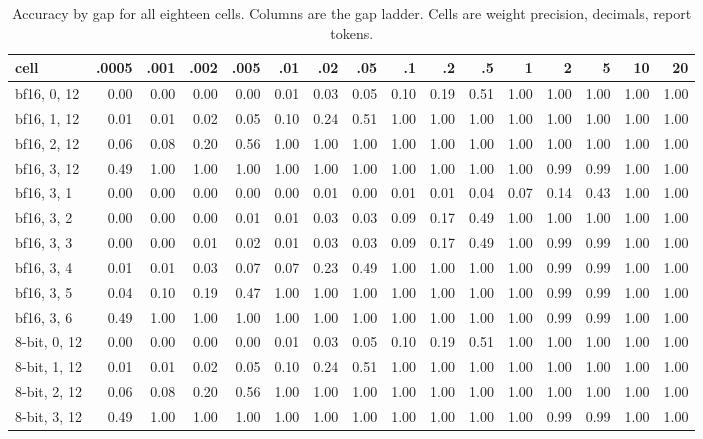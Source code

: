 \documentclass{article}
\theoremstyle{definition}
\theoremstyle{remark}
\begin{document}
\begin{table}[h]
\centering
\scriptsize
\caption{Accuracy by gap for all eighteen cells. Columns are the gap ladder. Cells are weight precision, decimals, report tokens.}
\label{tab:cells}
\setlength{\tabcolsep}{3pt}
\begin{tabular}{lrrrrrrrrrrrrrrr}
\toprule
cell & .0005 & .001 & .002 & .005 & .01 & .02 & .05 & .1 & .2 & .5 & 1 & 2 & 5 & 10 & 20 \\
\midrule
bf16, 0, 12 & 0.00 & 0.00 & 0.00 & 0.00 & 0.01 & 0.03 & 0.05 & 0.10 & 0.19 & 0.51 & 1.00 & 1.00 & 1.00 & 1.00 & 1.00 \\
bf16, 1, 12 & 0.01 & 0.01 & 0.02 & 0.05 & 0.10 & 0.24 & 0.51 & 1.00 & 1.00 & 1.00 & 1.00 & 1.00 & 1.00 & 1.00 & 1.00 \\
bf16, 2, 12 & 0.06 & 0.08 & 0.20 & 0.56 & 1.00 & 1.00 & 1.00 & 1.00 & 1.00 & 1.00 & 1.00 & 1.00 & 1.00 & 1.00 & 1.00 \\
bf16, 3, 12 & 0.49 & 1.00 & 1.00 & 1.00 & 1.00 & 1.00 & 1.00 & 1.00 & 1.00 & 1.00 & 1.00 & 0.99 & 0.99 & 1.00 & 1.00 \\
bf16, 3, 1 & 0.00 & 0.00 & 0.00 & 0.00 & 0.00 & 0.01 & 0.00 & 0.01 & 0.01 & 0.04 & 0.07 & 0.14 & 0.43 & 1.00 & 1.00 \\
bf16, 3, 2 & 0.00 & 0.00 & 0.00 & 0.01 & 0.01 & 0.03 & 0.03 & 0.09 & 0.17 & 0.49 & 1.00 & 1.00 & 1.00 & 1.00 & 1.00 \\
bf16, 3, 3 & 0.00 & 0.00 & 0.01 & 0.02 & 0.01 & 0.03 & 0.03 & 0.09 & 0.17 & 0.49 & 1.00 & 0.99 & 0.99 & 1.00 & 1.00 \\
bf16, 3, 4 & 0.01 & 0.01 & 0.03 & 0.07 & 0.07 & 0.23 & 0.49 & 1.00 & 1.00 & 1.00 & 1.00 & 0.99 & 0.99 & 1.00 & 1.00 \\
bf16, 3, 5 & 0.04 & 0.10 & 0.19 & 0.47 & 1.00 & 1.00 & 1.00 & 1.00 & 1.00 & 1.00 & 1.00 & 0.99 & 0.99 & 1.00 & 1.00 \\
bf16, 3, 6 & 0.49 & 1.00 & 1.00 & 1.00 & 1.00 & 1.00 & 1.00 & 1.00 & 1.00 & 1.00 & 1.00 & 0.99 & 0.99 & 1.00 & 1.00 \\
8-bit, 0, 12 & 0.00 & 0.00 & 0.00 & 0.00 & 0.01 & 0.03 & 0.05 & 0.10 & 0.19 & 0.51 & 1.00 & 1.00 & 1.00 & 1.00 & 1.00 \\
8-bit, 1, 12 & 0.01 & 0.01 & 0.02 & 0.05 & 0.10 & 0.24 & 0.51 & 1.00 & 1.00 & 1.00 & 1.00 & 1.00 & 1.00 & 1.00 & 1.00 \\
8-bit, 2, 12 & 0.06 & 0.08 & 0.20 & 0.56 & 1.00 & 1.00 & 1.00 & 1.00 & 1.00 & 1.00 & 1.00 & 1.00 & 1.00 & 1.00 & 1.00 \\
8-bit, 3, 12 & 0.49 & 1.00 & 1.00 & 1.00 & 1.00 & 1.00 & 1.00 & 1.00 & 1.00 & 1.00 & 1.00 & 0.99 & 0.99 & 1.00 & 1.00 \\

\end{tabular}
\end{table}
\end{document}
